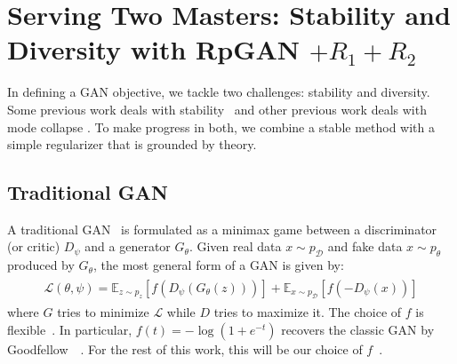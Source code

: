 

\section{Serving Two Masters: Stability and Diversity with RpGAN \texorpdfstring{$+ R_1+R_2$}{R-1R-2}}
\label{sec:loss}

In defining a GAN objective, we tackle two challenges: stability and diversity. Some previous work deals with stability~\cite{sg1,sg2,sg3} and other previous work deals with mode collapse \cite{rgan}. To make progress in both, we combine a stable method with a simple regularizer that is grounded by theory.


\subsection{Traditional GAN}
A traditional GAN~\cite{gan,nowozin2016f} is formulated as a minimax game between a discriminator (or critic) $D_\psi$ and a generator $G_\theta$. Given real data $x\sim p_\mathcal{D}$ and fake data $x\sim p_\theta$ produced by $G_\theta$, the most general form of a GAN is given by:
\begin{align}
\begin{split}
\label{eq:gan}
\mathcal{L}(\theta,\psi)=\mathbb{E}_{z\sim p_z}\left[f\left(  D_\psi(G_\theta(z))\right)\right]+\mathbb{E}_{x\sim p_\mathcal{D}}\left[f\left( -D_\psi(x) \right)\right]
\end{split}
\end{align}
\noindent where $G$ tries to minimize $\mathcal{L}$ while $D$ tries to maximize it. The choice of $f$ is flexible~\cite{lsgan,hingegan}. In particular, $f(t) = -\log(1+e^{-t})$ recovers the classic GAN by Goodfellow~\etal~\cite{gan}. For the rest of this work, this will be our choice of $f$~\cite{nowozin2016f}.

